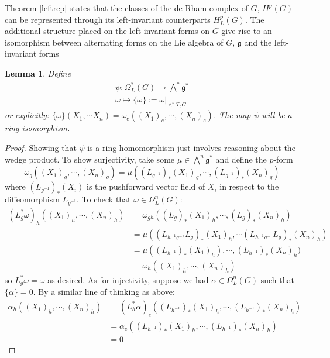 \documentclass[12pt]{amsart}
\newtheorem{lemma}[theorem]{Lemma}
\numberwithin{equation}{section}
\begin{document}
%
Theorem \ref{leftrep} states that the classes of the de Rham complex of $G$, $H^p(G)$ can be represented through its left-invariant counterparts $H^p_L(G)$. The additional structure placed on the left-invariant forms on $G$ give rise to an isomorphism between alternating forms on the Lie algebra of $G$, $\mathfrak{g}$ and the left-invariant forms
\begin{lemma} \label{nyaa}
Define
      \begin{gather}
        \psi: \Omega_L^{*}(G) \rightarrow \bigwedge^* \mathfrak{g}^* \\
        \omega \mapsto \{\omega\} := \omega\vert_{\wedge^n T_eG}
      \end{gather}
or explicitly:
$\{\omega\}(X_1,\cdots X_n) = \omega_e((X_1)_e, \cdots, (X_n)_e)$. The map $\psi$ will be a ring isomorphism.
\end{lemma}
\begin{proof}
  Showing that $\psi$ is a ring homomorphism just involves reasoning about the wedge product. To show surjectivity, take some $\mu \in \bigwedge^n\mathfrak{g}^*$ and define the $p$-form
  $$ \omega_g((X_1)_g,\cdots,(X_n)_g) = \mu((L_{g^{-1}})_*(X_1)_g, \cdots, (L_{g^{-1}})_*(X_n)_g) $$
  where $(L_{g^{-1}})_*(X_i)$ is the pushforward vector field of $X_i$ in respect to the diffeomorphism $L_{g^{-1}}$. To check that $\omega \in \Omega_L^n(G)$:
  \begin{align*}
    (L^*_g\omega)_h((X_1)_h, \cdots ,(X_n)_h)
    & = \omega_{gh}((L_g)_*(X_1)_h,\cdots, (L_g)_*(X_n)_h) \\
    & = \mu((L_{h^{-1}g^{-1}}L_g)_*(X_1)_h, \cdots (L_{h^{-1}g^{-1}}L_g)_*(X_n)_h) \\
    & = \mu((L_{h^{-1}})_*(X_1)_h), \cdots, (L_{h^{-1}})_*(X_n)_h) \\
    & = \omega_h((X_1)_h, \cdots, (X_n)_h)
  \end{align*}
  so $L^*_g\omega = \omega$ as desired. As for injectivity, suppose we had $\alpha \in \Omega^n_L(G)$ such that $\{\alpha\} = 0$. By a similar line of thinking as above:
  \begin{align*}
    \alpha_h((X_1)_h,\cdots,(X_n)_h)
    & = (L^*_h\alpha)_e((L_{h^{-1}})_*(X_1)_h, \cdots, (L_{h^{-1}})_*(X_n)_h) \\
    &= \alpha_e((L_{h^{-1}})_*(X_1)_h, \cdots, (L_{h^{-1}})_*(X_n)_h) \\
    & = 0
  \end{align*}
\end{proof}
\end{document}
